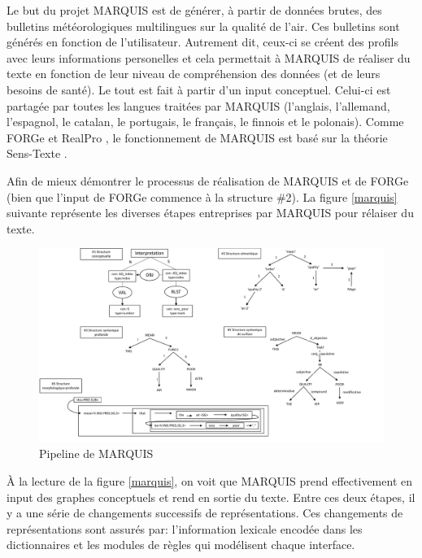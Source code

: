 Le but du projet MARQUIS est de générer, à partir de données brutes, des bulletins météorologiques multilingues sur la qualité de l'air. Ces bulletins sont générés en fonction de l'utilisateur. Autrement dit, ceux-ci se créent des profils avec leurs informations personelles et cela permettait à MARQUIS de réaliser du texte en fonction de leur niveau de compréhension des données (et de leurs besoins de santé). Le tout est fait à partir d'un input conceptuel. Celui-ci est partagée par toutes les langues traitées par MARQUIS (l'anglais, l'allemand, l'espagnol, le catalan, le portugais, le français, le finnois et le polonais). Comme FORGe \citep{MilledemoFORGePompeu2017} et RealPro \citep{LavoieFastPortableRealizer1997}, le fonctionnement de MARQUIS est basé sur la théorie Sens-Texte \citep{melcuk1988}.

Afin de mieux démontrer le processus de réalisation de MARQUIS et de FORGe (bien que l'input de FORGe commence à la structure \#2). La figure \ref{marquis} suivante représente les diverses étapes entreprises par MARQUIS pour rélaiser du texte.

\begin{figure}[htb]
	\centering
	\includegraphics[width=1\textwidth, trim = {0cm 0cm 0cm 0cm},clip]{ch2/figs/marquis.pdf}
	\caption{Pipeline de MARQUIS}
	\label{fig:marquis}
\end{figure}

À la lecture de la figure \ref{marquis}, on voit que MARQUIS prend effectivement en input des graphes conceptuels et rend en sortie du texte. Entre ces deux étapes, il y a une série de changements successifs de représentations. Ces changements de représentations sont assurés par: l'information lexicale encodée dans les dictionnaires et les modules de règles qui modélisent chaque interface. 

